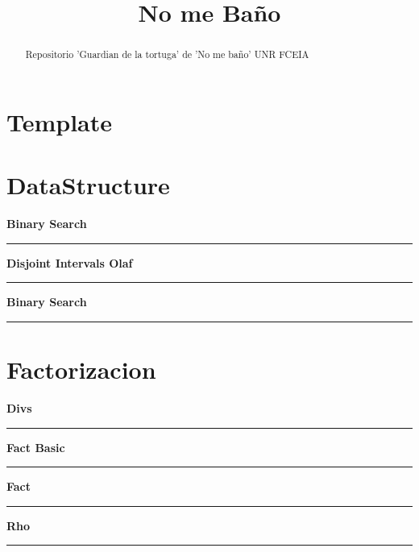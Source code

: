 \documentclass[a4paper, 12pt]{article}
\title{No me Baño}
\begin{document}
	\maketitle
	\begin{abstract} 
		Repositorio 'Guardian de la tortuga' de 'No me baño' UNR FCEIA
	\end{abstract}
	\newpage
	\section{Template}
		
		\newpage
	\section{DataStructure}
		\begin{center}{\Large\bf Binary Search}\\\noindent\rule{8cm}{0.4pt}\end{center}
		
		\begin{center}{\Large\bf Disjoint Intervals Olaf}\\\noindent\rule{8cm}{0.4pt}\end{center}
		
		\begin{center}{\Large\bf Binary Search}\\\noindent\rule{8cm}{0.4pt}\end{center}
		
		\newpage
	\section{Factorizacion}
	    \begin{center}{\Large\bf Divs}\\\noindent\rule{8cm}{0.4pt}\end{center}
		
		\begin{center}{\Large\bf Fact Basic}\\\noindent\rule{8cm}{0.4pt}\end{center}
		
		\begin{center}{\Large\bf Fact}\\\noindent\rule{8cm}{0.4pt}\end{center}
		
		\begin{center}{\Large\bf Rho}\\\noindent\rule{8cm}{0.4pt}\end{center}
		
		\newpage
\end{document}
